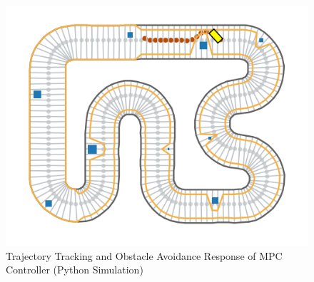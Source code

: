 \begin{figure}[H]\label{fig4.12}
\centering \includegraphics[scale=1]{Images/simulation_screenshot.png}
\caption{Trajectory Tracking and Obstacle Avoidance Response of MPC Controller (Python Simulation)}
\end{figure}